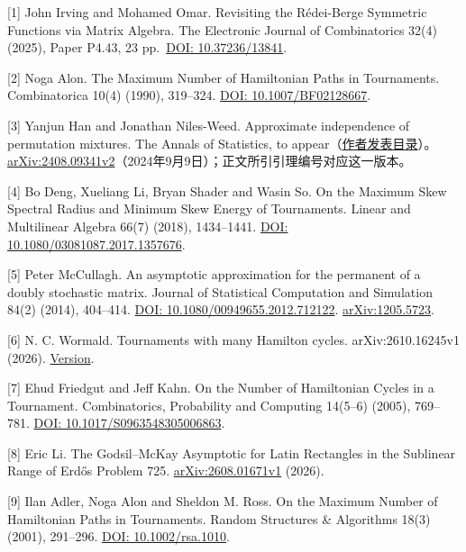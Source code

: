 \documentclass[11pt,a4paper]{article}
\makeatletter
\renewcommand\section{\@startsection{section}{1}{\z@}{-2.8ex plus -1ex minus -.2ex}{1.1ex plus .2ex}{\normalfont\large\bfseries}}
\makeatother
\begin{document}
\section{参考文献}\label{ux53c2ux8003ux6587ux732e}

{[}1{]} John Irving and Mohamed Omar. Revisiting the Rédei-Berge Symmetric Functions via Matrix Algebra. The Electronic Journal of Combinatorics 32(4) (2025), Paper P4.43, 23 pp.~\href{https://doi.org/10.37236/13841}{DOI: 10.37236/13841}.

{[}2{]} Noga Alon. The Maximum Number of Hamiltonian Paths in Tournaments. Combinatorica 10(4) (1990), 319--324. \href{https://doi.org/10.1007/BF02128667}{DOI: 10.1007/BF02128667}.

{[}3{]} Yanjun Han and Jonathan Niles-Weed. Approximate independence of permutation mixtures. The Annals of Statistics, to appear（\href{https://yanjunhan2021.github.io/publication.html}{作者发表目录}）。\href{https://arxiv.org/html/2408.09341v2}{arXiv:2408.09341v2}（2024年9月9日）；正文所引引理编号对应这一版本。

{[}4{]} Bo Deng, Xueliang Li, Bryan Shader and Wasin So. On the Maximum Skew Spectral Radius and Minimum Skew Energy of Tournaments. Linear and Multilinear Algebra 66(7) (2018), 1434--1441. \href{https://doi.org/10.1080/03081087.2017.1357676}{DOI: 10.1080/03081087.2017.1357676}.

{[}5{]} Peter McCullagh. An asymptotic approximation for the permanent of a doubly stochastic matrix. Journal of Statistical Computation and Simulation 84(2) (2014), 404--414. \href{https://doi.org/10.1080/00949655.2012.712122}{DOI: 10.1080/00949655.2012.712122}. \href{https://arxiv.org/abs/1205.5723}{arXiv:1205.5723}.

{[}6{]} N. C. Wormald. Tournaments with many Hamilton cycles. arXiv:2610.16245v1 (2026). \href{https://arxiv.org/html/2610.16245v1}{Version}.

{[}7{]} Ehud Friedgut and Jeff Kahn. On the Number of Hamiltonian Cycles in a Tournament. Combinatorics, Probability and Computing 14(5--6) (2005), 769--781. \href{https://doi.org/10.1017/S0963548305006863}{DOI: 10.1017/S0963548305006863}.

{[}8{]} Eric Li. The Godsil--McKay Asymptotic for Latin Rectangles in the Sublinear Range of Erdős Problem 725. \href{https://arxiv.org/html/2608.01671v1}{arXiv:2608.01671v1} (2026).

{[}9{]} Ilan Adler, Noga Alon and Sheldon M. Ross. On the Maximum Number of Hamiltonian Paths in Tournaments. Random Structures \& Algorithms 18(3) (2001), 291--296. \href{https://doi.org/10.1002/rsa.1010}{DOI: 10.1002/rsa.1010}.
\end{document}
